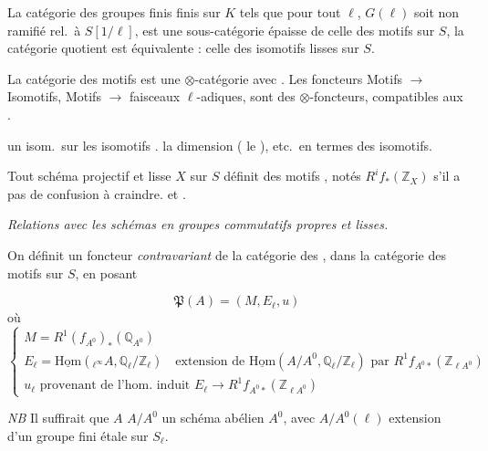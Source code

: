 \documentclass[11pt,a4paper]{article}
\begin{document}
La catégorie des groupes finis   finis sur $K$ tels que pour tout $\ell$, $G(\ell)$ soit non ramifié rel.\ à $S[1/\ell]$, est une sous-catégorie épaisse de celle des motifs sur $S$, la catégorie quotient est équivalente : celle des isomotifs lisses sur $S$.

La catégorie des motifs est une $\otimes$-catégorie avec . Les foncteurs Motifs $\to$ Isomotifs, Motifs $\to$ faisceaux $\ell$-adiques, sont des $\otimes$-foncteurs, compatibles aux .

 \ill{} \ill{} \ill{} \ill{} un isom.\ sur les isomotifs .   \ill{} la dimension ( le \ill{}  ),   etc.\ en termes des isomotifs.

Tout schéma projectif et lisse $X$ sur $S$ définit des motifs , notés $R^{i}f_{*}(\mathbb{Z}_{X})$ s'il  a pas de confusion à craindre. \ill{} \ill{} \ill{} \ill{}   et .

\emph{Relations avec les schémas en groupes commutatifs propres et lisses.}

On définit un foncteur \emph{contravariant} de la catégorie des    , dans la catégorie des motifs sur $S$, en posant

\[
\mathfrak{P}(A) = (M, E_{\ell}, u)
\]
où
\[
\begin{cases}
M = R^{1}(f_{A^{0}})_{*}(\mathbb{Q}_{A^{0}}) \\
E_{\ell} = \underline{\mathrm{Hom}}({}_{\ell^{\infty}}A, \mathbb{Q}_{\ell}/\mathbb{Z}_{\ell}) \quad \text{extension de } \underline{\mathrm{Hom}}(A/A^{0}, \mathbb{Q}_{\ell}/\mathbb{Z}_{\ell}) \text{ par } R^{1}f_{A^{0}*}(\mathbb{Z}_{\ell A^{0}}) \\
u_{\ell} \text{ provenant de l'hom.\ induit } E_{\ell} \to R^{1}f_{A^{0}*}(\mathbb{Z}_{\ell A^{0}})
\end{cases}
\]

\emph{NB} Il suffirait que $A$  \ill{} \ill{} $A/A^{0}$ \ill{} un schéma abélien $A^{0}$, avec $A/A^{0}(\ell)$ extension \ill{} d'un groupe fini étale sur $S_{\ell}$.
\end{document}
